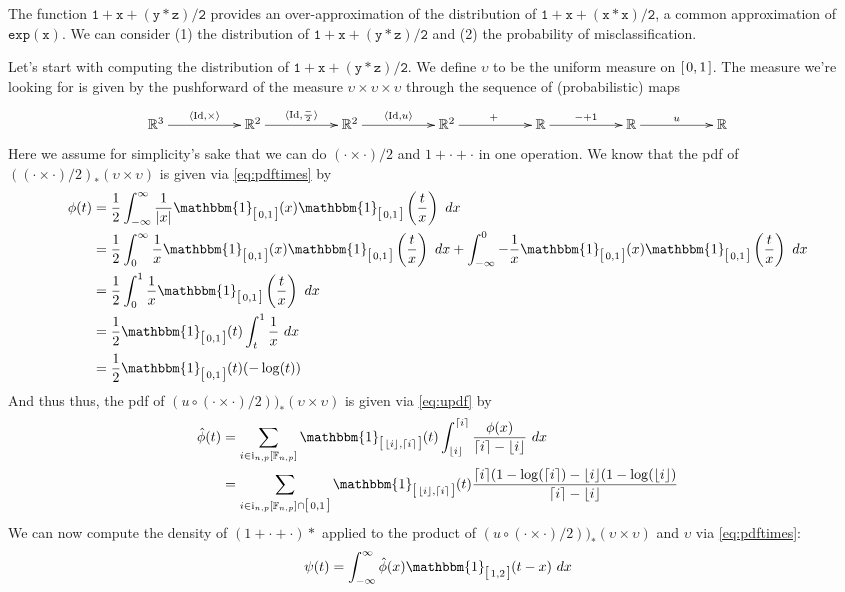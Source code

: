 \documentclass[10pt,a4paper]{article}
\theoremstyle{plain}
\theoremstyle{definition}
\newcommand{\F}[1][n,p]{\mathbb{F}_{#1}}
\newcommand{\R}{\mathbb{R}}
\newcommand{\Rep}[1][n,p]{\mathrm{i}_{#1}}
\newcommand{\one}{\mathbbm{1}}
\newcommand{\id}{\mathrm{Id}}
\newcommand{\ceil}[1]{\lceil #1 \rceil}
\newcommand{\floor}[1]{\lfloor #1 \rfloor}
\newcommand{\intvl}[1]{\mathlarger{\left[\right.}  #1 \mathlarger{\left.\right]}}
\newcommand{\absv}[1]{\vert #1\vert}
\begin{document}
The function $\mathtt{1+x+(y*z)/2}$ provides an over-approximation of the distribution of $\mathtt{1+x+(x*x)/2}$, a common approximation of $\mathtt{exp(x)}$. We can consider (1) the distribution of $\mathtt{1+x+(y*z)/2}$ and (2) the probability of misclassification.

Let's start with computing the distribution of $\mathtt{1+x+(y*z)/2}$. We define $\upsilon$ to be the uniform measure on $\intvl{0,1}$. The measure we're looking for is given by the pushforward of the measure $\upsilon\times\upsilon\times\upsilon$ through the sequence of (probabilistic) maps
\[
\xymatrix@C=12ex
{
\R^3\ar[r]^{\langle \id, \times\rangle} & \R^2\ar[r]^{\langle\id,\frac{-}{2}\rangle} & \R^2\ar[r]^{\langle\id,u\rangle} & \R^2 \ar[r]^{+} & \R\ar[r]^{-+1} &\R\ar[r]^{u}&\R
}
\]
Here we assume for simplicity's sake that we can do $(\cdot\times\cdot)/2$ and $1+\cdot+\cdot$ in one operation. We know that the pdf of $((\cdot \times \cdot)/2)_\ast(\upsilon\times\upsilon)$ is given via \eqref{eq:pdftimes} by
\begin{align*}
\phi(t)&=\frac{1}{2}\int_{-\infty}^\infty \frac{1}{\absv{x}} \one_{\intvl{0,1}}(x) \one_{\intvl{0,1}}\left(\frac{t}{x}\right)~dx\\
&=\frac{1}{2}\int_0^\infty \frac{1}{x}\one_{\intvl{0,1}}(x) \one_{\intvl{0,1}}\left(\frac{t}{x}\right)~dx+\int_{-\infty}^0 -\frac{1}{x}\one_{\intvl{0,1}}(x) \one_{\intvl{0,1}}\left(\frac{t}{x}\right)~dx\\
&=\frac{1}{2}\int_0^1 \frac{1}{x}\one_{\intvl{0,1}}\left(\frac{t}{x}\right)~dx\\
&=\frac{1}{2}\one_{\intvl{0,1}}(t)\int_t^1 \frac{1}{x}~dx \\
&=\frac{1}{2}\one_{\intvl{0,1}}(t) (-\log(t))
\end{align*}
And thus thus, the pdf of $(u\circ (\cdot \times \cdot)/2))_\ast(\upsilon\times\upsilon)$ is given via \eqref{eq:updf} by
\begin{align*}
\hat{\phi}(t)&=\sum_{i\in \Rep \left[\F\right]} \one_{\intvl{\floor{i},\ceil{i}}}(t) \int_{\floor{i}}^{\ceil{i}}\frac{\phi(x)}{\ceil{i}-\floor{i}} ~dx\\
&=\sum_{i\in \Rep \left[\F\right]\cap\intvl{0,1}}  \one_{\intvl{\floor{i},\ceil{i}}}(t) \frac{\ceil{i}(1-\log(\ceil{i})-\floor{i}(1-\log(\floor{i})}{\ceil{i}-\floor{i}}
\end{align*}
We can now compute the density of $(1+\cdot+\cdot)\ast$ applied to the product of $(u\circ (\cdot \times \cdot)/2))_\ast(\upsilon\times\upsilon)$  and $\upsilon$ via \eqref{eq:pdftimes}:
\begin{align*}
\psi(t)=\int_{-\infty}^\infty \hat{\phi}(x) \one_{\intvl{1,2}}(t-x)~dx
\end{align*}

 
\end{document}
